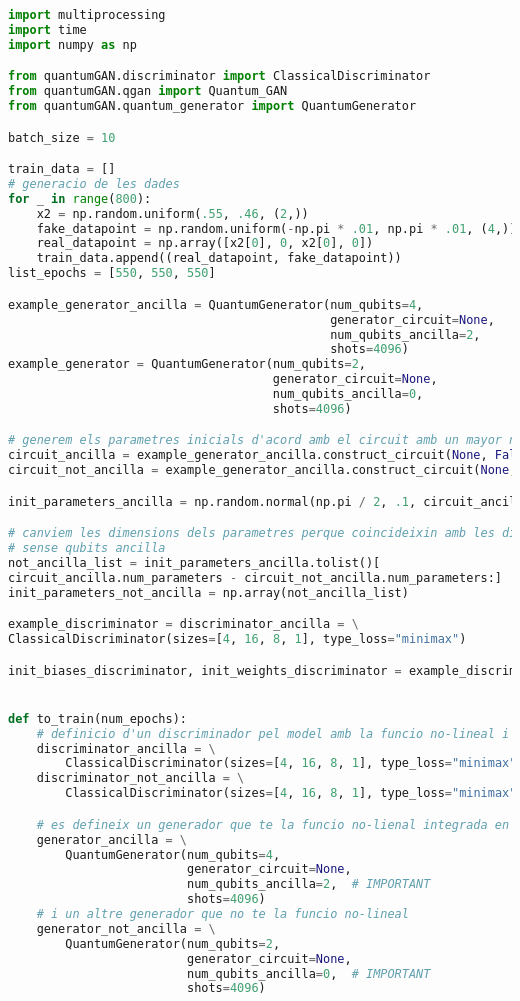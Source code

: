 \begin{lstlisting}[language=Python, caption=Executar els models amb multiprocessing]
import multiprocessing
import time
import numpy as np

from quantumGAN.discriminator import ClassicalDiscriminator
from quantumGAN.qgan import Quantum_GAN
from quantumGAN.quantum_generator import QuantumGenerator

batch_size = 10

train_data = []
# generacio de les dades
for _ in range(800):
	x2 = np.random.uniform(.55, .46, (2,))
	fake_datapoint = np.random.uniform(-np.pi * .01, np.pi * .01, (4,))
	real_datapoint = np.array([x2[0], 0, x2[0], 0])
	train_data.append((real_datapoint, fake_datapoint))
list_epochs = [550, 550, 550]

example_generator_ancilla = QuantumGenerator(num_qubits=4,
											 generator_circuit=None,
											 num_qubits_ancilla=2,
											 shots=4096)
example_generator = QuantumGenerator(num_qubits=2,
									 generator_circuit=None,
									 num_qubits_ancilla=0,
									 shots=4096)

# generem els parametres inicials d'acord amb el circuit amb un mayor nombre de parametres
circuit_ancilla = example_generator_ancilla.construct_circuit(None, False)
circuit_not_ancilla = example_generator_ancilla.construct_circuit(None, False)

init_parameters_ancilla = np.random.normal(np.pi / 2, .1, circuit_ancilla.num_parameters)

# canviem les dimensions dels parametres perque coincideixin amb les dimensions necessaries pel circuit
# sense qubits ancilla
not_ancilla_list = init_parameters_ancilla.tolist()[
circuit_ancilla.num_parameters - circuit_not_ancilla.num_parameters:]
init_parameters_not_ancilla = np.array(not_ancilla_list)

example_discriminator = discriminator_ancilla = \
ClassicalDiscriminator(sizes=[4, 16, 8, 1], type_loss="minimax")

init_biases_discriminator, init_weights_discriminator = example_discriminator.init_parameters()


def to_train(num_epochs):
	# definicio d'un discriminador pel model amb la funcio no-lineal i una altre pel model que no la te
	discriminator_ancilla = \
		ClassicalDiscriminator(sizes=[4, 16, 8, 1], type_loss="minimax")
	discriminator_not_ancilla = \
		ClassicalDiscriminator(sizes=[4, 16, 8, 1], type_loss="minimax")

	# es defineix un generador que te la funcio no-lienal integrada en el circuit
	generator_ancilla = \
		QuantumGenerator(num_qubits=4,
						 generator_circuit=None,
						 num_qubits_ancilla=2,  # IMPORTANT
						 shots=4096)
	# i un altre generador que no te la funcio no-lineal
	generator_not_ancilla = \
		QuantumGenerator(num_qubits=2,
     					 generator_circuit=None,
						 num_qubits_ancilla=0,  # IMPORTANT
						 shots=4096)


\end{lstlisting}
